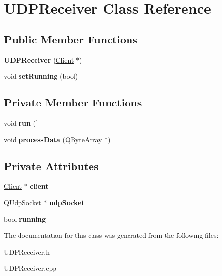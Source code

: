 \hypertarget{classUDPReceiver}{
\section{UDPReceiver Class Reference}
\label{classUDPReceiver}
}
\subsection*{Public Member Functions}
\begin{DoxyCompactItemize}
\item 
\hypertarget{classUDPReceiver_a162de5827c6b4095927345bf9cdc0158}{
{\bfseries UDPReceiver} (\hyperlink{classClient}{Client} $\ast$)}
\label{classUDPReceiver_a162de5827c6b4095927345bf9cdc0158}

\item 
\hypertarget{classUDPReceiver_a0df9b700d507888f3a944b9ac4f0a9c7}{
void {\bfseries setRunning} (bool)}
\label{classUDPReceiver_a0df9b700d507888f3a944b9ac4f0a9c7}

\end{DoxyCompactItemize}
\subsection*{Private Member Functions}
\begin{DoxyCompactItemize}
\item 
\hypertarget{classUDPReceiver_a777add1824b326697bd49e7d4fb2dee3}{
void {\bfseries run} ()}
\label{classUDPReceiver_a777add1824b326697bd49e7d4fb2dee3}

\item 
\hypertarget{classUDPReceiver_aa950b57dc03c8301091b2f0d3d842433}{
void {\bfseries processData} (QByteArray $\ast$)}
\label{classUDPReceiver_aa950b57dc03c8301091b2f0d3d842433}

\end{DoxyCompactItemize}
\subsection*{Private Attributes}
\begin{DoxyCompactItemize}
\item 
\hypertarget{classUDPReceiver_a2fa75c860deff6646831fd106e53e1d9}{
\hyperlink{classClient}{Client} $\ast$ {\bfseries client}}
\label{classUDPReceiver_a2fa75c860deff6646831fd106e53e1d9}

\item 
\hypertarget{classUDPReceiver_a95cbf5afbfcc67d3f43fc86bc68f3fd0}{
QUdpSocket $\ast$ {\bfseries udpSocket}}
\label{classUDPReceiver_a95cbf5afbfcc67d3f43fc86bc68f3fd0}

\item 
\hypertarget{classUDPReceiver_a65d83f7ace648ac450c5961e0189f9dd}{
bool {\bfseries running}}
\label{classUDPReceiver_a65d83f7ace648ac450c5961e0189f9dd}

\end{DoxyCompactItemize}


The documentation for this class was generated from the following files:\begin{DoxyCompactItemize}
\item 
UDPReceiver.h\item 
UDPReceiver.cpp\end{DoxyCompactItemize}
